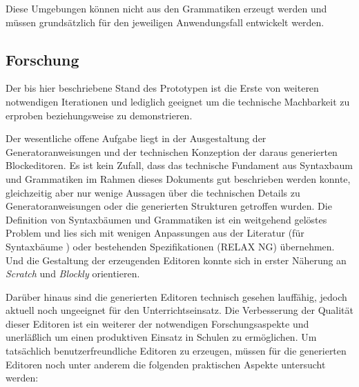 \documentclass[paper=a4,fontsize=11pt,parskip=half]{scrartcl}
\begin{document}
Diese Umgebungen können nicht aus den Grammatiken erzeugt werden und müssen grundsätzlich für den jeweiligen Anwendungsfall entwickelt werden.

\subsection{Forschung}

Der bis hier beschriebene Stand des Prototypen ist die Erste von weiteren notwendigen Iterationen und lediglich geeignet um die technische Machbarkeit zu erproben beziehungsweise zu demonstrieren.

Der wesentliche offene Aufgabe liegt in der Ausgestaltung der Generatoranweisungen und der technischen Konzeption der daraus generierten Blockeditoren. Es ist kein Zufall, dass das technische Fundament aus Syntaxbaum und Grammatiken im Rahmen dieses Dokuments gut beschrieben werden konnte, gleichzeitig aber nur wenige Aussagen über die technischen Details zu Generatoranweisungen oder die generierten Strukturen getroffen wurden. Die Definition von Syntaxbäumen und Grammatiken ist ein weitgehend gelöstes Problem und lies sich mit wenigen Anpassungen aus der Literatur (für Syntaxbäume \cite{aho_compilers:_2007}) oder bestehenden Spezifikationen (RELAX NG\cite{clark_relax_2001}) übernehmen. Und die Gestaltung der erzeugenden Editoren konnte sich in erster Näherung an \textit{Scratch} \cite{maloney_scratch:_2004} und \textit{Blockly} \cite{fraser_ten_2015} orientieren.


Darüber hinaus sind die generierten Editoren technisch gesehen lauffähig, jedoch aktuell noch ungeeignet für den Unterrichtseinsatz. Die Verbesserung der Qualität dieser Editoren ist ein weiterer der notwendigen Forschungsaspekte und unerläßlich um einen produktiven Einsatz in Schulen zu ermöglichen. Um tatsächlich benutzerfreundliche Editoren zu erzeugen, müssen für die generierten Editoren noch  unter anderem die folgenden praktischen Aspekte untersucht werden:
\end{document}
